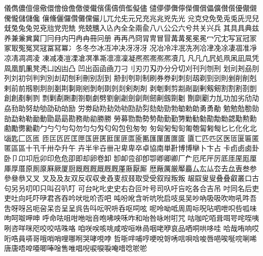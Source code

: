 儀󠄀儁󠄀儂󠄀儃󠄀億󠄀儆󠄀儇󠄀儈󠄀儉󠄀儋󠄀儌󠄀儍󠄀儎󠄀儐󠄀儒󠄀儔󠄀儕󠄀儖󠄀儗󠄀儘󠄀
儙󠄀儚󠄀儚󠄁儛󠄀儜󠄀儝󠄀儞󠄀償󠄀儡󠄀儣󠄀儧󠄀儨󠄀優󠄀儬󠄀儭󠄀儯󠄀儱󠄀儲󠄀儲󠄁儳󠄀
儴󠄀儵󠄀儷󠄀儸󠄀儹󠄀儺󠄀儻󠄀儼󠄀儿󠄀兀󠄀允󠄀兂󠄀元󠄀兄󠄀充󠄀兆󠄀兆󠄁兇󠄀先󠄀光󠄀
兊󠄀克󠄀兌󠄀免󠄀免󠄁兎󠄀兎󠄁兏󠄀児󠄀兒󠄀兓󠄀兔󠄀兔󠄁兔󠄂兕󠄀兗󠄀兘󠄀党󠄀兜󠄀兟󠄀
兠󠄀兢󠄀兤󠄀入󠄀兦󠄀內󠄀全󠄀全󠄁兩󠄀兪󠄀八󠄀八󠄁公󠄀公󠄁六󠄀兮󠄀共󠄀关󠄀兴󠄀兵󠄀
其󠄀具󠄀具󠄁典󠄀兹󠄀养󠄀兼󠄀兼󠄁兾󠄀冀󠄀冂󠄀冃󠄀冄󠄀内󠄀円󠄀冉󠄀冉󠄁冊󠄀冋󠄀册󠄀
再󠄀再󠄁冎󠄀冏󠄀冐󠄀冑󠄀冒󠄀冒󠄁冓󠄀冓󠄁冕󠄀冕󠄁冕󠄂冖󠄀冗󠄀冘󠄀写󠄀冝󠄀冠󠄀冡󠄀
冢󠄀冣󠄀冤󠄀冤󠄁冥󠄀冦󠄀冨󠄀冩󠄀冪󠄀冫󠄀冬󠄀冬󠄁冭󠄀冰󠄀冱󠄀冲󠄀决󠄀冴󠄀冴󠄁冴󠄂
况󠄀冶󠄀冷󠄀冸󠄀冺󠄀冼󠄀冽󠄀冾󠄀冿󠄀凂󠄀凃󠄀凄󠄀凅󠄀准󠄀凈󠄀凉󠄀凊󠄀凋󠄀凋󠄁凌󠄀
凍󠄀减󠄀凑󠄀凒󠄀凓󠄀凔󠄀凕󠄀凖󠄀凘󠄀凛󠄀凛󠄁凜󠄀凝󠄀凞󠄀凞󠄁凞󠄂凞󠄃凞󠄄凟󠄀几󠄀
凡󠄀凡󠄁凢󠄀凥󠄀処󠄀凧󠄀凩󠄀凪󠄀凬󠄀凭󠄀凮󠄀凰󠄀凱󠄀凲󠄀凳󠄀凴󠄀凵󠄀凶󠄀凷󠄀凸󠄀
凹󠄀出󠄀函󠄀函󠄁凾󠄀刀󠄀刁󠄀刂󠄀刃󠄀刃󠄁刄󠄀刅󠄀分󠄀分󠄁切󠄀刈󠄀刊󠄀刋󠄀刎󠄀刑󠄀
划󠄀刓󠄀刔󠄀刕󠄀刖󠄀列󠄀刘󠄀初󠄀刢󠄀判󠄀判󠄁別󠄀刦󠄀刧󠄀刨󠄀利󠄀刪󠄀别󠄀刮󠄀到󠄀
刱󠄀刲󠄀刳󠄀刵󠄀制󠄀刷󠄀券󠄀券󠄁刹󠄀刺󠄀刻󠄀刼󠄀剃󠄀剄󠄀剅󠄀則󠄀剉󠄀削󠄀削󠄁剋󠄀
剌󠄀前󠄀前󠄁剏󠄀剔󠄀剕󠄀剖󠄀剗󠄀剘󠄀剚󠄀剛󠄀剜󠄀剝󠄀剞󠄀剟󠄀剠󠄀剡󠄀剣󠄀剤󠄀剤󠄁
剥󠄀剦󠄀剩󠄀剪󠄀剬󠄀剮󠄀副󠄀剰󠄀剱󠄀剱󠄁割󠄀割󠄁割󠄂剳󠄀剴󠄀創󠄀創󠄁剷󠄀剸󠄀剹󠄀
剽󠄀剿󠄀劀󠄀劂󠄀劃󠄀劄󠄀劅󠄀劇󠄀劈󠄀劉󠄀劊󠄀劌󠄀劍󠄀劍󠄁劑󠄀劒󠄀劓󠄀劔󠄀劕󠄀劖󠄀
劗󠄀劘󠄀劚󠄀力󠄀劜󠄀功󠄀加󠄀劣󠄀劤󠄀劥󠄀劦󠄀劧󠄀助󠄀努󠄀劫󠄀劬󠄀劭󠄀劯󠄀劰󠄀励󠄀
労󠄀劵󠄀劶󠄀劷󠄀劸󠄀効󠄀劺󠄀劻󠄀劼󠄀劽󠄀劾󠄀勀󠄀勁󠄀勃󠄀勄󠄀勅󠄀勆󠄀勇󠄀勇󠄁勈󠄀
勉󠄀勉󠄁勊󠄀勌󠄀勍󠄀勏󠄀勐󠄀勑󠄀勒󠄀勔󠄀動󠄀勖󠄀勗󠄀勗󠄁勘󠄀務󠄀勛󠄀勜󠄀勝󠄀勝󠄁
勞󠄀募󠄀勠󠄀勡󠄀勢󠄀勢󠄁勣󠄀勤󠄀勤󠄁勥󠄀勦󠄀勧󠄀勨󠄀勩󠄀勪󠄀勬󠄀勰󠄀勱󠄀勲󠄀勳󠄀
勴󠄀勵󠄀勶󠄀勷󠄀勸󠄀勹󠄀勺󠄀勺󠄁勻󠄀勾󠄀勿󠄀匀󠄀匀󠄁匁󠄀匂󠄀匃󠄀包󠄀包󠄁匆󠄀匇󠄀
匇󠄁匈󠄀匊󠄀匋󠄀匌󠄀匍󠄀匏󠄀匐󠄀匑󠄀匓󠄀匕󠄀匕󠄁化󠄀化󠄁北󠄀匘󠄀匙󠄀匚󠄀匛󠄀匜󠄀
匝󠄀匞󠄀匟󠄀匠󠄀匡󠄀匣󠄀匤󠄀匥󠄀匧󠄀匨󠄀匩󠄀匪󠄀匫󠄀匬󠄀匭󠄀匯󠄀匰󠄀匱󠄀匲󠄀匳󠄀
匵󠄀匸󠄀匹󠄀匹󠄁区󠄀医󠄀匼󠄀匽󠄀匾󠄀匿󠄀匿󠄁區󠄀區󠄁十󠄀卂󠄀千󠄀卅󠄀卆󠄀升󠄀午󠄀
卉󠄀半󠄀半󠄁卋󠄀卌󠄀卍󠄀卑󠄀卑󠄁卒󠄀卓󠄀協󠄀南󠄀単󠄀卙󠄀博󠄀博󠄁卛󠄀卜󠄀卞󠄀占󠄀
卡󠄀卣󠄀卥󠄀卥󠄁卦󠄀卧󠄀卩󠄀卬󠄀卭󠄀卮󠄀卯󠄀印󠄀危󠄀危󠄁卲󠄀即󠄀却󠄀卵󠄀卷󠄀卸󠄀
卸󠄁卹󠄀卺󠄀卻󠄀卽󠄀卾󠄀卿󠄀卿󠄁卿󠄂厂󠄀厃󠄀厄󠄀厇󠄀厈󠄀厉󠄀厎󠄀厓󠄀厔󠄀厖󠄀厘󠄀
厙󠄀厚󠄀厝󠄀原󠄀厠󠄀厡󠄀厤󠄀厥󠄀厦󠄀厨󠄀厩󠄀厩󠄁厩󠄂厩󠄃厩󠄄厩󠄅厪󠄀厫󠄀厭󠄀厮󠄀
厯󠄀厰󠄀厲󠄀厳󠄀厴󠄀厵󠄀厶󠄀厷󠄀厸󠄀厺󠄀去󠄀厽󠄀叀󠄀叁󠄀参󠄀參󠄀叄󠄀叅󠄀又󠄀叉󠄀
叉󠄁及󠄀及󠄁友󠄀双󠄀反󠄀収󠄀収󠄁叏󠄀叒󠄀叓󠄀叔󠄀叕󠄀取󠄀受󠄀受󠄁叙󠄀叚󠄀叛󠄀叛󠄁
叝󠄀叞󠄀叟󠄀叟󠄁叠󠄀叠󠄁叡󠄀叢󠄀口󠄀古󠄀句󠄀另󠄀叧󠄀叨󠄀叩󠄀只󠄀叫󠄀召󠄀叭󠄀叮󠄀
可󠄀台󠄀叱󠄀叱󠄁史󠄀史󠄁右󠄀叴󠄀叵󠄀叶󠄀号󠄀司󠄀叺󠄀吁󠄀吂󠄀吃󠄀各󠄀合󠄀吉󠄀吊󠄀
吋󠄀同󠄀名󠄀后󠄀吏󠄀吏󠄁吐󠄀向󠄀吒󠄀吓󠄀吚󠄀君󠄀吝󠄀吞󠄀吟󠄀吠󠄀吡󠄀吤󠄀否󠄀吧󠄀
吨󠄀吩󠄀吪󠄀含󠄀听󠄀吭󠄀吮󠄀启󠄀吱󠄀吳󠄀吴󠄀吵󠄀吶󠄀吸󠄀吸󠄁吹󠄀吻󠄀吼󠄀吽󠄀吾󠄀
吿󠄀呀󠄀呀󠄁呂󠄀呃󠄀呄󠄀呆󠄀呇󠄀呈󠄀呈󠄁呉󠄀告󠄀呌󠄀呍󠄀呎󠄀呏󠄀呑󠄀呕󠄀呞󠄀呟󠄀
呢󠄀呤󠄀呦󠄀呧󠄀周󠄀周󠄁呩󠄀呪󠄀呫󠄀呬󠄀呭󠄀呮󠄀呰󠄀呱󠄀味󠄀呴󠄀呵󠄀呶󠄀呷󠄀呻󠄀
呼󠄀命󠄀呿󠄀咀󠄀咁󠄀咃󠄀咄󠄀咅󠄀咆󠄀咈󠄀咉󠄀咊󠄀咋󠄀和󠄀咍󠄀咎󠄀咏󠄀咐󠄀咑󠄀咒󠄀
咕󠄀咖󠄀咜󠄀咟󠄀咠󠄀咡󠄀咢󠄀咤󠄀咥󠄀咦󠄀咧󠄀咨󠄀咩󠄀咪󠄀咫󠄀咬󠄀咬󠄁咭󠄀咮󠄀咯󠄀
咱󠄀咲󠄀咲󠄁咳󠄀咷󠄀咸󠄀咹󠄀咺󠄀咻󠄀咼󠄀咽󠄀咾󠄀咿󠄀哀󠄀品󠄀哂󠄀哃󠄀哄󠄀哆󠄀哇󠄀
哈󠄀哉󠄀哊󠄀响󠄀哎󠄀哘󠄀哠󠄀員󠄀哢󠄀哥󠄀哦󠄀哨󠄀哨󠄁哩󠄀哪󠄀哬󠄀哭󠄀哮󠄀哯󠄀哱󠄀
哲󠄀哳󠄀哶󠄀哺󠄀哼󠄀哽󠄀哾󠄀哿󠄀唀󠄀唁󠄀唄󠄀唅󠄀唆󠄀唇󠄀唈󠄀唉󠄀唌󠄀唍󠄀唎󠄀唏󠄀
唐󠄀唐󠄁唔󠄀唕󠄀唖󠄀唧󠄀唪󠄀唫󠄀售󠄀唯󠄀唱󠄀唲󠄀唳󠄀唳󠄁唳󠄂唵󠄀唶󠄀唸󠄀唹󠄀唹󠄁
